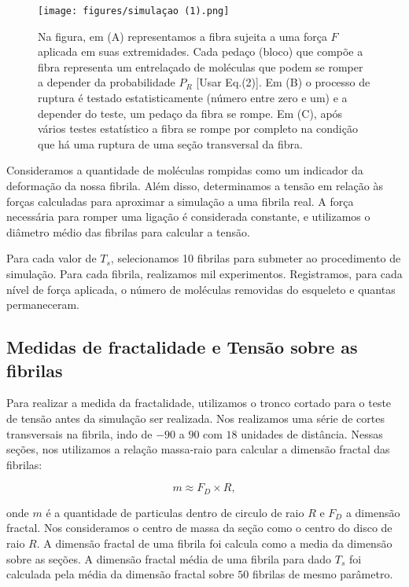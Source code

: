 \documentclass{article}
\begin{document}
        \begin{figure}[H]
            \centering
            \texttt{[image: figures/simulaçao (1).png]}
    
            \caption{Na figura, em (A) representamos a fibra sujeita a uma força $F$ aplicada em suas extremidades. Cada pedaço (bloco) que compõe 
            a fibra representa um entrelaçado de moléculas que podem se romper a depender da probabilidade $P_{R}$ [Usar Eq.(2)]. Em (B) o processo 
            de ruptura é testado estatisticamente (número entre zero e um) e a depender do teste, um pedaço da fibra se rompe. Em (C), após vários 
            testes estatístico a fibra se rompe por completo na condição que há uma ruptura de uma seção transversal da fibra.} 
    
            \label{M4}
        \end{figure}

      
        Consideramos a quantidade de moléculas rompidas como um indicador da deformação da nossa fibrila. Além disso, determinamos a tensão em relação 
        às forças calculadas para aproximar a simulação a uma fibrila real. A força necessária para romper uma ligação é considerada constante, e 
        utilizamos o diâmetro médio das fibrilas para calcular a tensão. 

        Para cada valor de \(T_{s}\), selecionamos 10 fibrilas para submeter ao procedimento de simulação. Para cada fibrila, realizamos mil 
        experimentos. Registramos, para cada nível de força aplicada, o número de moléculas removidas do esqueleto e quantas permaneceram. 
        
        \subsection{Medidas de fractalidade e Tensão sobre as fibrilas}

        Para realizar a medida da fractalidade, utilizamos o tronco cortado para o teste de tensão antes da simulação ser realizada. Nos 
        realizamos uma série de cortes transversais na fibrila, indo de \(-90\) a \(90\) com \(18\) unidades de distância. Nessas seções, 
        nos utilizamos a relação massa-raio para calcular a dimensão fractal das fibrilas:

        \begin{equation}
            m \approx F_{D} \times R,
        \end{equation}

        \noindent onde \(m\) é a quantidade de particulas dentro de circulo de raio \(R\) e \(F_{D}\) a dimensão fractal.
        Nos consideramos o centro de massa da seção como o centro do disco de raio \(R\). A dimensão fractal de uma fibrila
        foi calcula como a media da dimensão sobre as seções. A dimensão fractal média de uma fibrila para dado \(T_{s}\) foi 
        calculada pela média da dimensão fractal sobre \(50\) fibrilas de mesmo parâmetro.
\end{document}
